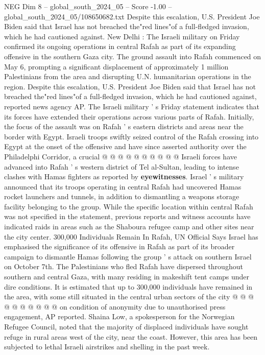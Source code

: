 \begin{textsample}{NEG Dim 8 – global\_south\_2024\_05 – Score -1.00 – global\_south\_2024\_05/108650682.txt}  \label{ex:f8_neg_232}
Despite this escalation, U.S.
President Joe Biden said that Israel has not breached the"red lines"of a full-fledged invasion, which he had cautioned against.
New Delhi : The Israeli military on Friday confirmed its ongoing operations in central Rafah as part of its expanding offensive in the southern Gaza city.
The ground assault into Rafah commenced on May 6, prompting a significant displacement of approximately 1 million Palestinians from the area and disrupting U.N. humanitarian operations in the region.
Despite this escalation, U.S.
President Joe Biden said that Israel has not breached the"red lines"of a full-fledged invasion, which he had cautioned against, reported news agency AP.
The Israeli military ' s Friday statement indicates that its forces have extended their operations across various parts of Rafah.
Initially, the focus of the assault was on Rafah ' s eastern districts and areas near the border with Egypt.
Israeli troops swiftly seized control of the Rafah crossing into Egypt at the onset of the offensive and have since asserted authority over the Philadelphi Corridor, a crucial @ @ @ @ @ @ @ @ @ @ Israeli forces have advanced into Rafah ' s western district of Tel al-Sultan, leading to intense clashes with Hamas fighters as reported by \textbf{eyewitnesses}.
Israel ' s military announced that its troops operating in central Rafah had uncovered Hamas rocket launchers and tunnels, in addition to dismantling a weapons storage facility belonging to the group.
While the specific location within central Rafah was not specified in the statement, previous reports and witness accounts have indicated raids in areas such as the Shaboura refugee camp and other sites near the city center. 300,000 Individuals Remain In Rafah, UN Official Says Israel has emphasised the significance of its offensive in Rafah as part of its broader campaign to dismantle Hamas following the group ' s attack on southern Israel on October 7th.
The Palestinians who fled Rafah have dispersed throughout southern and central Gaza, with many residing in makeshift tent camps under dire conditions.
It is estimated that up to 300,000 individuals have remained in the area, with some still situated in the central urban sectors of the city @ @ @ @ @ @ @ @ @ @ on condition of anonymity due to unauthorised press engagement, AP reported.
Shaina Low, a spokesperson for the Norwegian Refugee Council, noted that the majority of displaced individuals have sought refuge in rural areas west of the city, near the coast.
However, this area has been subjected to lethal Israeli airstrikes and shelling in the past week.

\end{textsample}
